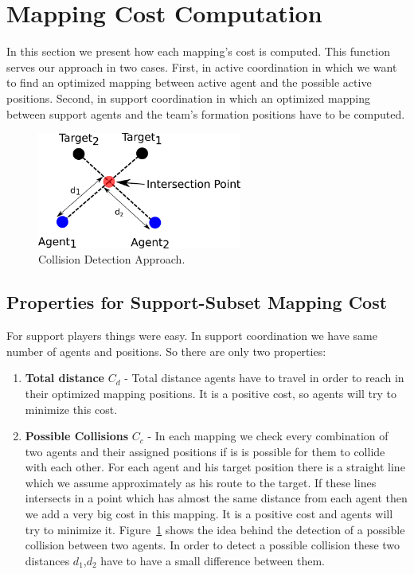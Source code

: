 \section{Mapping Cost Computation}
In this section we present how each mapping's cost is computed. This function serves our approach in two cases. First, in active coordination in which we want to find an optimized mapping between active agent and the possible active positions. Second, in support coordination in which an optimized mapping between support agents and the team's formation positions have to be computed.

\begin{figure}[t!]
\centering
  \includegraphics[width=0.6\textwidth]{Chapter4/figures/AvoidCollision.pdf}
  \caption{Collision Detection Approach.} 
  \label{fig:AvoidCollision}
\end{figure}

\subsection{Properties for Support-Subset Mapping Cost}
For support players things were easy. In support coordination we have same number of agents and positions. So there are only two properties:  
\begin{enumerate}
\item \textbf{Total distance }$C_{d}$ - Total distance agents have to travel in order to reach in their optimized mapping positions. It is a positive cost, so agents will try to minimize this cost.
\item \textbf{Possible Collisions }$C_{c}$ - In each mapping we check every combination of two agents and their assigned positions if is is possible for them to collide with each other. For each agent and his target position there is a straight line which we assume approximately as his route to the target. If these lines intersects in a point which has almost the same distance from each agent then we add a very big cost in this mapping. It is a positive cost and agents will try to minimize it. Figure~\ref{fig:AvoidCollision} shows the idea behind the detection of a possible collision between two agents. In order to detect a possible collision these two distances $d_{1}$,$d_{2}$ have to have a small difference between them. 
\end{enumerate}

